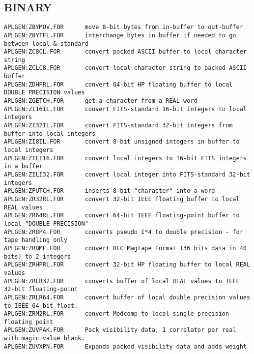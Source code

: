 \subsection{BINARY}
\begin{verbatim}
APLGEN:ZBYMOV.FOR      move 8-bit bytes from in-buffer to out-buffer
APLGEN:ZBYTFL.FOR      interchange bytes in buffer if needed to go between local & standard
APLGEN:ZC8CL.FOR       convert packed ASCII buffer to local character string
APLGEN:ZCLC8.FOR       convert local character string to packed ASCII buffer
APLGEN:ZDHPRL.FOR      convert 64-bit HP floating buffer to local DOUBLE PRECISION values
APLGEN:ZGETCH.FOR      get a character from a REAL word
APLGEN:ZI16IL.FOR      convert FITS-standard 16-bit integers to local integers
APLGEN:ZI32IL.FOR      convert FITS-standard 32-bit integers from buffer into local integers
APLGEN:ZI8IL.FOR       convert 8-bit unsigned integers in buffer to local integers
APLGEN:ZILI16.FOR      convert local integers to 16-bit FITS integers in a buffer
APLGEN:ZILI32.FOR      convert local integer into FITS-standard 32-bit integers
APLGEN:ZPUTCH.FOR      inserts 8-bit "character" into a word
APLGEN:ZR32RL.FOR      convert 32-bit IEEE floating buffer to local REAL values
APLGEN:ZR64RL.FOR      convert 64-bit IEEE floating-point buffer to local "DOUBLE PRECISION"
APLGEN:ZR8P4.FOR       converts pseudo I*4 to double precision - for tape handling only
APLGEN:ZRDMF.FOR       convert DEC Magtape Format (36 bits data in 40 bits) to 2 integers
APLGEN:ZRHPRL.FOR      convert 32-bit HP floating buffer to local REAL values
APLGEN:ZRLR32.FOR      converts buffer of local REAL values to IEEE 32-bit floating-point
APLGEN:ZRLR64.FOR      convert buffer of local double precision values to IEEE 64-bit float.
APLGEN:ZRM2RL.FOR      convert Modcomp to local single precision floating point
APLGEN:ZUVPAK.FOR      Pack visibility data, 1 correlator per real with magic value blank.
APLGEN:ZUVXPN.FOR      Expands packed visibility data and adds weight
\end{verbatim}
 

